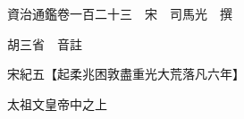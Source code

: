 










 


 
 


 

  
  
  
  
  





  
  
  
  
  
 
  

  

  
  
  



  

 
 

  
   




  

  
  


  　　資治通鑑卷一百二十三　宋　司馬光　撰

　　胡三省　音註

　　宋紀五【起柔兆困敦盡重光大荒落凡六年】

　　太祖文皇帝中之上

